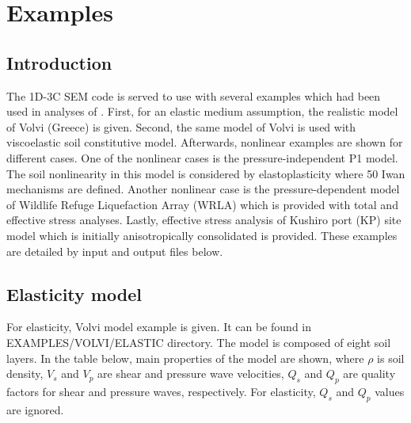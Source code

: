 \chapter{Examples}

\section{Introduction}
The 1D-3C SEM code is served to use with several examples which had been used in analyses of \cite{Oral2016}. First, for an elastic medium assumption, the realistic model of Volvi (Greece) is given. Second, the same model of Volvi is used with viscoelastic soil constitutive model. Afterwards, nonlinear examples are shown for different cases. One of the nonlinear cases is the pressure-independent P1 model. The soil nonlinearity in this model is considered by elastoplasticity where 50 Iwan mechanisms are defined. Another nonlinear case is the pressure-dependent model of Wildlife Refuge Liquefaction Array (WRLA) which is provided with total and effective stress analyses. Lastly, effective stress analysis of Kushiro port (KP) site model which is initially anisotropically consolidated is provided. These examples are detailed by input and output files below.\\


\section{Elasticity model}

For elasticity, Volvi model example is given. It can be found in EXAMPLES\slash VOLVI\slash ELASTIC directory. The model is composed of eight soil layers. In the table below, main properties of the model are shown, where $\rho$ is soil density, $V_{s}$ and $V_{p}$ are shear and pressure wave velocities, $Q_{s}$ and $Q_{p}$ are quality factors for shear and pressure waves, respectively. For elasticity, $Q_{s}$ and $Q_{p}$ values are ignored. \\


